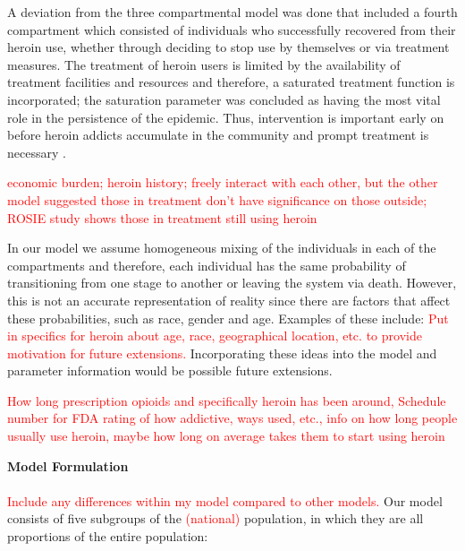 \documentclass[12pt]{article}
\begin{document}
A deviation from the three compartmental model was done that included a fourth compartment which consisted of individuals who successfully recovered from their heroin use, whether through deciding to stop use by themselves or via treatment measures. The treatment of heroin users is limited by the availability of treatment facilities and resources and therefore, a saturated treatment function is incorporated; the saturation parameter was concluded as having the most vital role in the persistence of the epidemic. Thus, intervention is important early on before heroin addicts accumulate in the community and prompt treatment is necessary \cite{Wangari}. 

\textcolor{red}{economic burden; heroin history; freely interact with each other, but the other model suggested those in treatment don't have significance on those outside; ROSIE study shows those in treatment still using heroin}

In our model we assume homogeneous mixing of the individuals in each of the compartments and therefore, each individual has the same probability of transitioning from one stage to another or leaving the system via death. However, this is not an accurate representation of reality since there are factors that affect these probabilities, such as race, gender and age. Examples of these include: \textcolor{red}{Put in specifics for heroin about age, race, geographical location, etc. to provide motivation for future extensions.} Incorporating these ideas into the model and parameter information would be possible future extensions. 

\textcolor{red}{How long prescription opioids and specifically heroin has been around, Schedule number for FDA rating of how addictive, ways used, etc., info on how long people usually use heroin, maybe how long on average takes them to start using heroin}

\textbf{Model Formulation} \\ \\
\textcolor{red}{Include any differences within my model compared to other models.}
Our model consists of five subgroups of the \textcolor{red}{(national)} population, in which they are all proportions of the entire population: 
\end{document}
